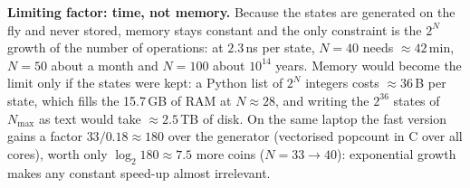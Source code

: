 \textbf{Limiting factor: time, not memory.} Because the states are generated on the fly and never stored, memory stays constant and the only constraint is the $2^N$ growth of the number of operations: at $2.3$\,ns per state, $N=40$ needs $\approx42$\,min, $N=50$ about a month and $N=100$ about $10^{14}$ years. Memory would become the limit only if the states were kept: a Python list of $2^N$ integers costs $\approx36$\,B per state, which fills the 15.7\,GB of RAM at $N\approx28$, and writing the $2^{36}$ states of $N_{\max}$ as text would take $\approx2.5$\,TB of disk. On the same laptop the fast version gains a factor $33/0.18\approx180$ over the generator (vectorised popcount in C over all cores), worth only $\log_2 180\approx7.5$ more coins ($N=33\to40$): exponential growth makes any constant speed-up almost irrelevant.
